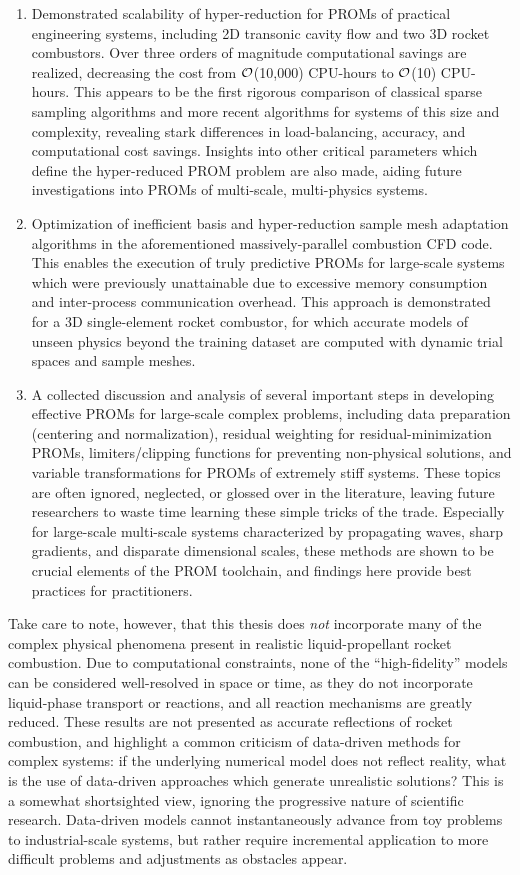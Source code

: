 \begin{enumerate}
    \item Demonstrated scalability of hyper-reduction for PROMs of practical engineering systems, including 2D transonic cavity flow and two 3D rocket combustors. Over three orders of magnitude computational savings are realized, decreasing the cost from $\mathcal{O}$(10,000) CPU-hours to $\mathcal{O}$(10) CPU-hours. This appears to be the first rigorous comparison of classical sparse sampling algorithms and more recent algorithms for systems of this size and complexity, revealing stark differences in load-balancing, accuracy, and computational cost savings. Insights into other critical parameters which define the hyper-reduced PROM problem are also made, aiding future investigations into PROMs of multi-scale, multi-physics systems.
    \item Optimization of inefficient basis and hyper-reduction sample mesh adaptation algorithms in the aforementioned massively-parallel combustion CFD code. This enables the execution of truly predictive PROMs for large-scale systems which were previously unattainable due to excessive memory consumption and inter-process communication overhead. This approach is demonstrated for a 3D single-element rocket combustor, for which accurate models of unseen physics beyond the training dataset are computed with dynamic trial spaces and sample meshes.
    \item A collected discussion and analysis of several important steps in developing effective PROMs for large-scale complex problems, including data preparation (centering and normalization), residual weighting for residual-minimization PROMs, limiters/clipping functions for preventing non-physical solutions, and variable transformations for PROMs of extremely stiff systems. These topics are often ignored, neglected, or glossed over in the literature, leaving future researchers to waste time learning these simple tricks of the trade. Especially for large-scale multi-scale systems characterized by propagating waves, sharp gradients, and disparate dimensional scales, these methods are shown to be crucial elements of the PROM toolchain, and findings here provide best practices for practitioners. 
\end{enumerate}

Take care to note, however, that this thesis does \textit{not} incorporate many of the complex physical phenomena present in realistic liquid-propellant rocket combustion. Due to computational constraints, none of the ``high-fidelity'' models can be considered well-resolved in space or time, as they do not incorporate liquid-phase transport or reactions, and all reaction mechanisms are greatly reduced. These results are not presented as accurate reflections of rocket combustion, and highlight a common criticism of data-driven methods for complex systems: if the underlying numerical model does not reflect reality, what is the use of data-driven approaches which generate unrealistic solutions? This is a somewhat shortsighted view, ignoring the progressive nature of scientific research. Data-driven models cannot instantaneously advance from toy problems to industrial-scale systems, but rather require incremental application to more difficult problems and adjustments as obstacles appear. 


